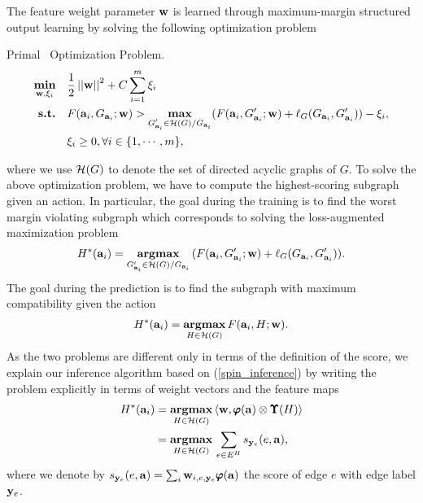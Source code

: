 {%
The feature weight parameter $\mathbf {w}$ is learned through maximum-margin structured output learning by solving the following optimization problem
\begin{definition}{Primal \spin\ Optimization Problem.}
\begin{align*}
	\underset{\mathbf {w},\mathbf{\xi}_i}{\textbf{min}} &\quad \frac{1}{2}\left|\left| \mathbf {w} \right|\right|^2+C\sum_{i=1}^{m}\xi_i\\
	\textbf{s.t.} &\quad F(\mathbf {a}_i,G_{\mathbf {a}_i};\mathbf {w}) > \underset{\substack{G_{\mathbf {a}_i}'\in\mathcal{H}(G)/G_{\mathbf {a}_i}}}{\textbf{max}}(F(\mathbf {a}_i,G_{\mathbf {a}_i}';\mathbf {w})+\mathbf {\ell}_{G}(G_{\mathbf {a}_i},G_{\mathbf {a}_i}')) - \xi_i,\\
	&\quad \xi_i\ge0, \forall i\in\{1,\cdots,m\},
\end{align*}
\end{definition}
where we use $\mathcal{H}(G)$ to denote the set of directed acyclic graphs of $G$.
To solve the above optimization problem, we have to compute the highest-scoring subgraph given an action. 
In particular, the goal during the training is to find the worst margin violating subgraph which corresponds to solving the loss-augmented maximization problem
\begin{align*}
	H^*(\mathbf {a}_i) = \underset{G_{\mathbf {a}_i}'\in\mathcal{H}(G)/G_{\mathbf {a}_i}}{\textbf{argmax}}\, (F(\mathbf {a}_i,G_{\mathbf {a}_i}';\mathbf {w})+\mathbf {\ell}_{G}(G_{\mathbf {a}_i},G_{\mathbf {a}_i}')).
\end{align*}
The goal during the prediction is to find the subgraph with maximum compatibility given the action
\begin{align}
	H^*(\mathbf {a}_i) = \underset{H\in\mathcal{H}(G)}{\textbf{argmax}}\, F(\mathbf {a}_i,H;\mathbf {w}) \label{spin_inference}.
\end{align}
As the two problems are different only in terms of the definition of the score, we explain our inference algorithm based on (\ref{spin_inference}) by writing the problem explicitly in terms of weight vectors and the feature maps
\begin{align}
	H^*(\mathbf {a}_i) &= \underset{H\in\mathcal{H}(G)}{\textbf{argmax}}\, \langle \mathbf {w}, \pmb \varphi(\mathbf {a})\otimes\pmb \Upsilon(H) \rangle \nonumber \\
	&= \underset{H\in\mathcal{H}(G)}{\textbf{argmax}}\, \sum_{e\in E^H}s_{\mathbf {y}_e}(e,\mathbf {a}), \label{spin_np}
\end{align}
where we denote by $s_{\mathbf {y}_e}(e,\mathbf {a}) = \sum_{i}\mathbf {w}_{i,e,\mathbf {y}_e}\pmb \varphi(\mathbf {a})$ the score of edge $e$ with edge label $\mathbf {y}_e$.

}
